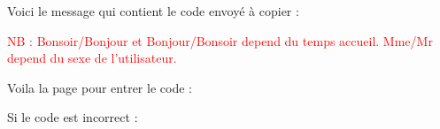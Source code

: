 \documentclass{article}
\begin{document}
\begin{enumerate}
Voici le message qui contient le code envoyé à copier :

\textcolor{red}{NB : Bonsoir/Bonjour et Bonjour/Bonsoir depend du temps accueil. Mme/Mr depend du sexe de l'utilisateur.}


\vspace{0.4cm}
\hspace*{-0.7in}
               \noindent{}


Voila la page pour entrer le code :

\vspace{0.4cm}
\hspace*{-0.7in}
               \noindent{}




Si le code est incorrect :


\end{enumerate}
\end{document}
